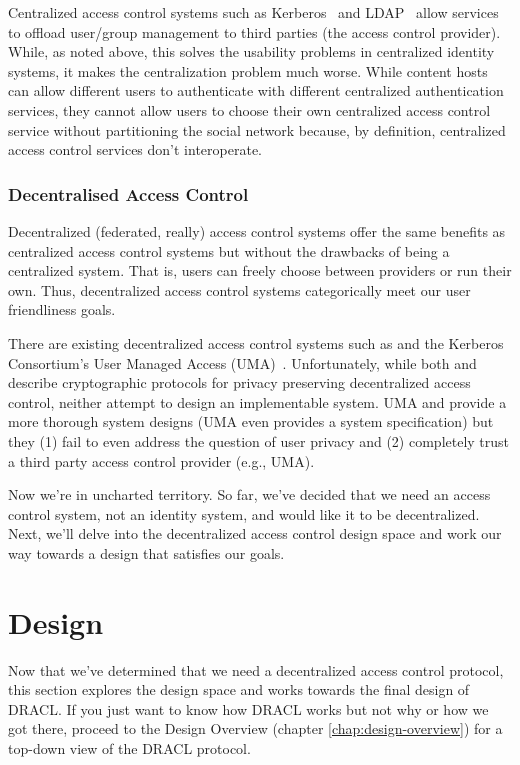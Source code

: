 \documentclass[pdftex,12pt,a4papaer]{report}
\begin{document}
Centralized access control systems such as Kerberos~\cite{kerberos} and
LDAP~\cite{ldap} allow services to offload user/group management to third
parties (the access control provider). While, as noted above, this solves the
usability problems in centralized identity systems, it makes the centralization
problem much worse. While content hosts can allow different users to
authenticate with different centralized authentication services, they cannot
allow users to choose their own centralized access control service without
partitioning the social network because, by definition, centralized access
control services don't interoperate.

\subsubsection{Decentralised Access Control}

Decentralized (federated, really) access control systems offer the same benefits
as centralized access control systems but without the drawbacks of being a
centralized system. That is, users can freely choose between providers or run
their own. Thus, decentralized access control systems categorically meet our
user friendliness goals.

There are existing decentralized access control systems such as \cite{attrib}
\cite{privattrib} \cite{drbac} \cite{socnet} and the Kerberos Consortium's User
Managed Access (UMA)~\cite{uma}. Unfortunately, while both \cite{attrib} and
\cite{privattrib} describe cryptographic protocols for privacy preserving
decentralized access control, neither attempt to design an implementable system.
UMA\cite{uma} \cite{drbac} and \cite{socnet} provide a more thorough system
designs (UMA even provides a system specification) but they (1) fail to even
address the question of user privacy and (2) completely trust a third party
access control provider (e.g., UMA).

Now we're in uncharted territory. So far, we've decided that we need an access
control system, not an identity system, and would like it to be decentralized.
Next, we'll delve into the decentralized access control design space and work
our way towards a design that satisfies our goals.

\section{Design}
\label{sec:design}

Now that we've determined that we need a decentralized access control protocol,
this section explores the design space and works towards the final design of
DRACL. If you just want to know how DRACL works but not why or how we got there,
proceed to the Design Overview (chapter \ref{chap:design-overview}) for a
top-down view of the DRACL protocol.
\end{document}

